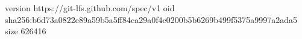 version https://git-lfs.github.com/spec/v1
oid sha256:b6d73a0822e89a59b5a5ff84ca29a0f4c0200b5b6269b499f5375a9997a2ada5
size 626416
